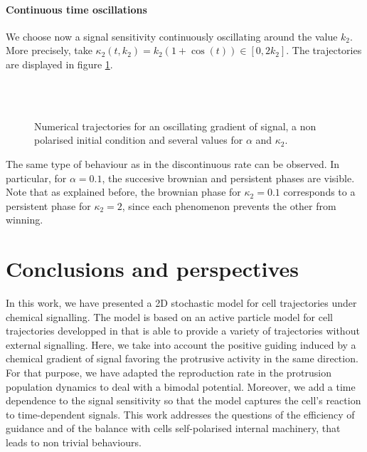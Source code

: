 \documentclass[a4paper,11pt]{article}
\begin{document}
\paragraph{Continuous time oscillations}
We choose now a signal sensitivity continuously oscillating around the value $k_2$. More precisely, take $\kappa_2(t,k_2)= k_2(1+\cos(t)) \in [0,2k_2]$. The trajectories are displayed in figure \ref{fig:OnOffcos}.

\begin{figure}[H]
	\centering
	\quad
	\\	
		\quad
	\\	
	\caption{Numerical trajectories for an oscillating gradient of signal, a non polarised initial condition and several values for $\alpha$ and $\kappa_2$.}\label{fig:OnOffcos}
\end{figure}

The same type of behaviour as in the discontinuous rate can be observed. In particular, for $\alpha=0.1$, the succesive brownian and persistent phases are visible. Note that as explained before, the brownian phase for $\kappa_2=0.1$ corresponds to a persistent phase for $\kappa_2=2$, since each phenomenon prevents the other from winning. 


\section{Conclusions and perspectives}
In this work, we have presented a 2D stochastic model for cell trajectories under chemical signalling. The model is based on an active particle model for cell trajectories developped in \citep{etchegaray:tel-01533458} that is able to provide a variety of trajectories without external signalling. 
Here, we take into account the positive guiding induced by a chemical gradient of signal favoring the protrusive activity in the same direction. For that purpose, we have adapted the reproduction rate in the protrusion population dynamics to deal with a bimodal potential. Moreover, we add a time dependence to the signal sensitivity so that the model captures the cell's reaction to time-dependent signals.
This work addresses the questions of the efficiency of guidance and of the balance with cells self-polarised internal machinery, that leads to non trivial behaviours. \par 
 
\end{document}
